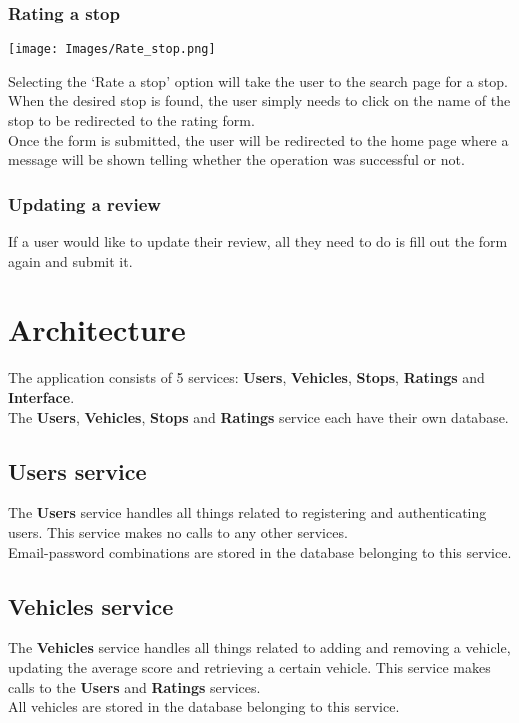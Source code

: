 \documentclass[12pt]{article}
\begin{document}
\subsubsection{Rating a stop}
\begin{center}
	\texttt{[image: Images/Rate\_stop.png]}
\end{center}
Selecting the `Rate a stop' option will take the user to the search page for a stop. When the desired stop is found, the user simply needs to click on the name of the stop to be redirected to the rating form.\\
Once the form is submitted, the user will be redirected to the home page where a message will be shown telling whether the operation was successful or not.

\subsubsection{Updating a review}
If a user would like to update their review, all they need to do is fill out the form again and submit it.
\newpage

\section{Architecture}
The application consists of 5 services: \textbf{Users}, \textbf{Vehicles}, \textbf{Stops}, \textbf{Ratings} and \textbf{Interface}.\\
The \textbf{Users}, \textbf{Vehicles}, \textbf{Stops} and \textbf{Ratings} service each have their own database. 

\subsection{Users service}
The \textbf{Users} service handles all things related to registering and authenticating users. This service makes no calls to any other services.\\ 
Email-password combinations are stored in the database belonging to this service.

\subsection{Vehicles service}
The \textbf{Vehicles} service handles all things related to adding and removing a vehicle, updating the average score and retrieving a certain vehicle. This service makes calls to the \textbf{Users} and \textbf{Ratings} services.\\
All vehicles are stored in the database belonging to this service.
\end{document}

